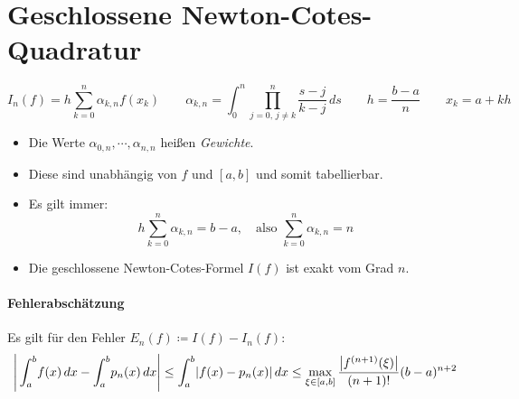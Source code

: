     \section{Geschlossene Newton-Cotes-Quadratur} %
        \begin{equation*}
	        I_n(f) = h \sum_{k=0}^{n} \alpha_{k,n} f(x_k) \qquad \alpha_{k,n} = \int_{0}^{n} \! \prod_{j = 0,\, j \neq k}^{n} \frac{s-j}{k-j} \, ds \qquad h = \frac{b-a}{n} \qquad x_k = a + kh
        \end{equation*}
        \begin{itemize}
        	\item Die Werte \( \alpha_{0, n}, \cdots, \alpha_{n, n} \) heißen \textit{Gewichte}.
        	\item Diese sind unabhängig von \(f\) und \([a, b]\) und somit tabellierbar.
        	\item Es gilt immer:
	        	\begin{equation*}
		        	h \sum_{k=0}^{n} \alpha_{k,n} = b - a, \quad\textrm{also } \sum_{k=0}^{n} \alpha_{k, n} = n
	        	\end{equation*}
	        \item Die geschlossene Newton-Cotes-Formel \(I(f)\) ist exakt vom Grad \(n\).
        \end{itemize}
    
        \paragraph{Fehlerabschätzung}
	        Es gilt für den Fehler \( E_n(f) \coloneqq I(f) - I_n(f) \):
	        \begin{equation*}
		        \Bigg\lvert \int_{a}^{b} \! f(x) \, dx - \int_{a}^{b} \! p_n(x) \, dx \Bigg\rvert \leq \int_{a}^{b} \! \abs{f(x) - p_n(x)} \, dx \leq \max_{\xi \in [a, b]} \frac{\abs{f^{(n + 1)}(\xi)}}{(n + 1)!} (b - a) ^ {n+2}
	        \end{equation*}
        
